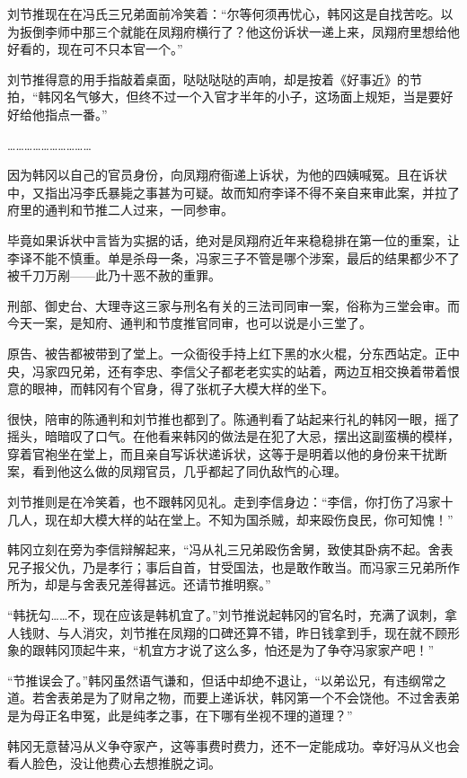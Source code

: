 刘节推现在在冯氏三兄弟面前冷笑着：“尔等何须再忧心，韩冈这是自找苦吃。以为扳倒李师中那三个就能在凤翔府横行了？他这份诉状一递上来，凤翔府里想给他好看的，现在可不只本官一个。”

刘节推得意的用手指敲着桌面，哒哒哒哒的声响，却是按着《好事近》的节拍，“韩冈名气够大，但终不过一个入官才半年的小子，这场面上规矩，当是要好好给他指点一番。”

…………………………

因为韩冈以自己的官员身份，向凤翔府衙递上诉状，为他的四姨喊冤。且在诉状中，又指出冯李氏暴毙之事甚为可疑。故而知府李译不得不亲自来审此案，并拉了府里的通判和节推二人过来，一同参审。

毕竟如果诉状中言皆为实据的话，绝对是凤翔府近年来稳稳排在第一位的重案，让李译不能不慎重。单是杀母一条，冯家三子不管是哪个涉案，最后的结果都少不了被千刀万剐——此乃十恶不赦的重罪。

刑部、御史台、大理寺这三家与刑名有关的三法司同审一案，俗称为三堂会审。而今天一案，是知府、通判和节度推官同审，也可以说是小三堂了。

原告、被告都被带到了堂上。一众衙役手持上红下黑的水火棍，分东西站定。正中央，冯家四兄弟，还有李忠、李信父子都老老实实的站着，两边互相交换着带着恨意的眼神，而韩冈有个官身，得了张杌子大模大样的坐下。

很快，陪审的陈通判和刘节推也都到了。陈通判看了站起来行礼的韩冈一眼，摇了摇头，暗暗叹了口气。在他看来韩冈的做法是在犯了大忌，摆出这副蛮横的模样，穿着官袍坐在堂上，而且亲自写诉状递诉状，这等于是明着以他的身份来干扰断案，看到他这么做的凤翔官员，几乎都起了同仇敌忾的心理。

刘节推则是在冷笑着，也不跟韩冈见礼。走到李信身边：“李信，你打伤了冯家十几人，现在却大模大样的站在堂上。不知为国杀贼，却来殴伤良民，你可知愧！”

韩冈立刻在旁为李信辩解起来，“冯从礼三兄弟殴伤舍舅，致使其卧病不起。舍表兄子报父仇，乃是孝行；事后自首，甘受国法，也是敢作敢当。而冯家三兄弟所作所为，却是与舍表兄差得甚远。还请节推明察。”

“韩抚勾……不，现在应该是韩机宜了。”刘节推说起韩冈的官名时，充满了讽刺，拿人钱财、与人消灾，刘节推在凤翔的口碑还算不错，昨日钱拿到手，现在就不顾形象的跟韩冈顶起牛来，“机宜方才说了这么多，怕还是为了争夺冯家家产吧！”

“节推误会了。”韩冈虽然语气谦和，但话中却绝不退让，“以弟讼兄，有违纲常之道。若舍表弟是为了财帛之物，而要上递诉状，韩冈第一个不会饶他。不过舍表弟是为母正名申冤，此是纯孝之事，在下哪有坐视不理的道理？”

韩冈无意替冯从义争夺家产，这等事费时费力，还不一定能成功。幸好冯从义也会看人脸色，没让他费心去想推脱之词。

